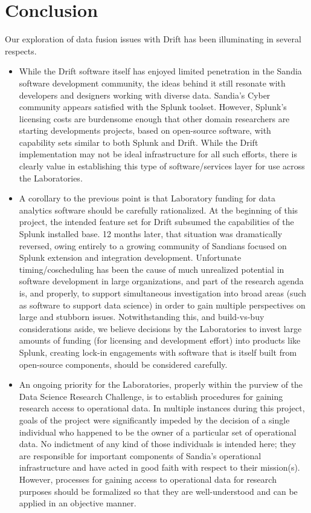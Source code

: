 
\section{Conclusion}

Our exploration of data fusion issues with Drift has been illuminating in several respects.  

\begin{itemize}

\item While the Drift software itself has enjoyed limited penetration in the Sandia software development
  community, the ideas behind it still resonate with developers and designers working with diverse data.
  Sandia's Cyber community appears satisfied with the Splunk toolset.  However, Splunk's licensing costs are
  burdensome enough that other domain researchers are starting developments projects, based on
  open-source software, with capability sets similar to both Splunk and Drift.  While the Drift
  implementation may not be ideal infrastructure for all such efforts, there is clearly value in
  establishing this type of software/services layer for use across the Laboratories.

\item A corollary to the previous point is that Laboratory funding for data analytics software should be
  carefully rationalized.  At the beginning of this project, the intended feature set for Drift subsumed
  the capabilities of the Splunk installed base.  12 months later, that situation was dramatically
  reversed, owing entirely to a growing community of Sandians focused on Splunk extension and integration
  development.  Unfortunate timing/coscheduling has been the cause of much unrealized potential in software
  development in large organizations, and part of the research agenda is, and properly, to support
  simultaneous investigation into broad areas (such as software to support data science) in order to gain
  multiple perspectives on large and stubborn issues.  Notwithstanding this, and build-vs-buy
  considerations aside, we believe decisions by the Laboratories to invest large amounts of
  funding (for licensing and development effort) into products like Splunk, creating lock-in engagements
  with software that is itself built from open-source components, should be considered carefully.

\item An ongoing priority for the Laboratories, properly within the purview of the Data Science Research
  Challenge, is to establish procedures for gaining research access to operational data.  In multiple
  instances during this project, goals of the project were significantly impeded by the decision of a
  single individual who happened to be the owner of a particular set of operational data.  No indictment
  of any kind of those individuals is intended here; they are responsible for important components of
  Sandia's operational infrastructure and have acted in good faith with respect to their mission(s).
  However, processes for gaining access to operational data for research purposes should be formalized so
  that they are well-understood and can be applied in an objective manner.  


\end{itemize}
